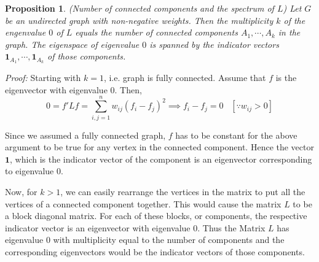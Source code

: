 \documentclass[10pt,a4paper, nocenter]{report}
\newtheorem{prop}{Proposition}
\begin{document}
    \begin{prop}
        (Number of connected components and the spectrum of $L$) Let $G$ be an undirected graph with non-negative weights. Then the multiplicity $k$ of the engenvalue $0$ of $L$ equals the number of connected components $A_{1},\cdots,A_{k}$ in the graph. The eigenspace of eigenvalue $0$ is spanned by the indicator vectors $\mathbf{1}_{A_{1}},\cdots,\mathbf{1}_{A_{k}}$ of those components.				
    \end{prop}
    \textit{Proof:}
    Starting with $k=1$, i.e. graph is fully connected. Assume that $f$ is the eigenvector with eigenvalue $0$. Then,
    $$ 0 = f'Lf = \sum_{i,j=1}^{n}w_{ij}(f_{i}-f_{j})^{2} \implies f_{i} - f_{j}=0 \hspace{10pt}[\because w_{ij} > 0]$$
    
    Since we assumed a fully connected graph, $f$ has to be constant for the above argument to be true for any vertex in the connected component. Hence the vector $\textbf{1}$, which is the indicator vector of the component is an eigenvector corresponding to eigenvalue $0$. 
    
    Now, for $k>1$, we can easily rearrange the vertices in the matrix to put all the vertices of a connected component together. This would cause the matrix $L$ to be a block diagonal matrix. For each of these blocks, or components, the respective indicator vector is an eigenvector with eigenvalue 0. Thus the Matrix $L$ has eigenvalue $0$ with multiplicity equal to the number of components and the corresponding eigenvectors would be the indicator vectors of those components. 
    $ $\\
\end{document}
